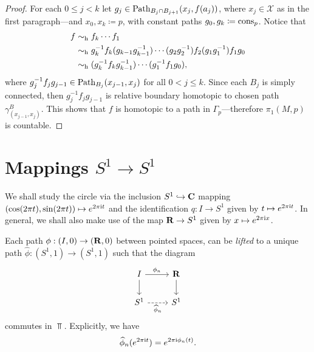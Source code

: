 \begin{proof}
    For each \(0 \leq j < k\) let \(g_j \in \operatorname{Path}_{B_j \cap B_{j+1}}(x_j, f(a_j))\),
    where \(x_j \in \mathcal{X}\) as in the first paragraph---and \(x_0, x_k
    \coloneq p\), with constant paths \(g_0, g_k \coloneq \operatorname{cons}_p\). Notice that
    \begin{align*}
        f & \sim_{\text{h}} f_k \cdots f_1                                                               \\
          & \sim_{\text{h}} g_k^{-1} f_k (g_{k-1} g_{k-1}^{-1}) \cdots (g_2 g_2^{-1}) f_2 (g_1 g_1^{-1})
        f_1 g_0                                                                                 \\
          & \sim_{\text{h}} (g_k^{-1} f_k  g_{k-1}^{-1}) \cdots (g_1^{-1} f_1 g_0),                      \\
    \end{align*}
    where \(g_j^{-1} f_j g_{j-1} \in \operatorname{Path}_{B_j}(x_{j-1}, x_j)\) for all
    \(0 < j \leq k\). Since each \(B_j\) is simply connected, then
    \(g_j^{-1} f_j g_{j-1}\) is relative boundary homotopic to chosen path
    \(\gamma_{(x_{j-1}, x_j)}^B\). This shows that \(f\) is homotopic to a path in
    \(\Gamma_p\)---therefore \(\pi_1(M, p)\) is countable.
\end{proof}



\section{Mappings \texorpdfstring{\(S^1 \longrightarrow S^1\)}{S1 -> S1}}

We shall study the circle via the inclusion \(S^1 \hookrightarrow \mathbf{C}\) mapping
\((\cos(2 \pi t), \sin(2 \pi t)) \mapsto e^{2 \pi \text{i} t}\) and the
identification \(q: I \to S^1\) given by \(t \mapsto e^{2 \pi \text{i} t}\). In
general, we shall also make use of the map \(\mathbf{R} \to S^1\) given by
\(x \mapsto e^{2 \pi \text{i} x}\).

Each path \(\phi: (I, 0) \to (\mathbf{R}, 0)\) between pointed spaces, can be
\emph{lifted} to a unique path \(\widehat \phi: (S^1, 1) \to (S^1, 1)\) such
that the diagram
\[
    \begin{tikzcd}
        I \ar[r, "\phi_n"] \ar[d] &\R \ar[d] \\
        S^1 \ar[r, dashed, "\widehat \phi_n"'] &S^1
    \end{tikzcd}
\]
commutes in \(\Top\). Explicitly, we have
\[
    \widehat \phi_n(e^{2 \pi \text{i} t}) = e^{2 \pi \text{i} \phi_n(t)}.
\]

